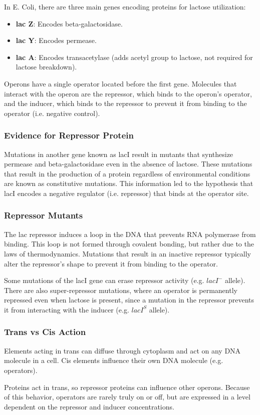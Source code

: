 \documentclass[12pt,titlepage]{article}
\begin{document}
        In E. Coli, there are three main genes encoding proteins for lactose utilization:
        \begin{itemize}
          \item \textbf{lac Z}: Encodes beta-galactosidase.
          \item \textbf{lac Y}: Encodes permease.
          \item \textbf{lac A}: Encodes transacetylase (adds acetyl group to lactose, not required for lactose breakdown).
        \end{itemize}

        Operons have a single operator located before the first gene. Molecules that interact with the operon are the repressor, which binds to the operon's operator,
        and the inducer, which binds to the repressor to prevent it from binding to the operator (i.e. negative control).

      \subsubsection{Evidence for Repressor Protein}
        Mutations in another gene known as lacI result in mutants that synthesize permease and beta-galactosidase even in the absence of lactose. These mutations
        that result in the production of a protein regardless of environmental conditions are known as constitutive mutations. This information led to the
        hypothesis that lacI encodes a negative regulator (i.e. repressor) that binds at the operator site.

      \subsubsection{Repressor Mutants}
        The lac repressor induces a loop in the DNA that prevents RNA polymerase from binding. This loop is not formed through covalent bonding, but rather due to
        the laws of thermodynamics. Mutations that result in an inactive repressor typically alter the repressor's shape to prevent it from binding to the operator.

        Some mutations of the lacI gene can erase repressor activity (e.g. $lacI^-$ allele). There are also super-repressor mutations, where an operator is
        permanently repressed even when lactose is present, since a mutation in the repressor prevents it from interacting with the inducer (e.g. $lacI^S$ allele).

      \subsubsection{Trans vs Cis Action}
        Elements acting in trans can diffuse through cytoplasm and act on any DNA molecule in a cell. Cis elements influence their own DNA molecule (e.g. operators).

        Proteins act in trans, so repressor proteins can influence other operons. Because of this behavior, operators are rarely truly on or off, but are expressed
        in a level dependent on the repressor and inducer concentrations.
\end{document}
